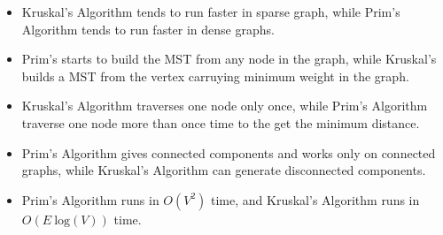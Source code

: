 \documentclass[12pt]{article}
\theoremstyle{definition}
\begin{document}
\begin{itemize}
	\item Kruskal's Algorithm tends to run faster in sparse graph, while Prim's Algorithm tends to run faster in dense graphs.
	\item Prim's starts to build the MST from any node in the graph, while Kruskal's builds a MST from the vertex carruying minimum weight in the graph.
	\item Kruskal's Algorithm traverses one node only once, while Prim's Algorithm traverse one node more than once time to the get the minimum distance.
	\item Prim's Algorithm gives connected components and works only on connected graphs, while Kruskal's Algorithm can generate disconnected components.
	\item Prim's Algorithm runs in $O(V^2)$ time, and Kruskal's Algorithm runs in $O(E \ \textrm{log}(V))$ time.
\end{itemize}
\end{document}
